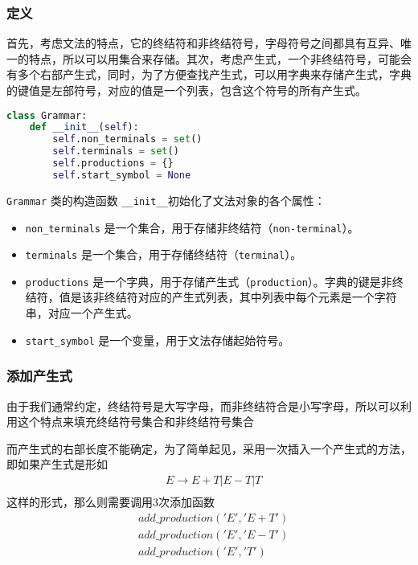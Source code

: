 \documentclass[lang=cn,11pt,a4paper]{elegantpaper}
\begin{document}
\subsubsection{定义}
首先，考虑文法的特点，它的终结符和非终结符号，字母符号之间都具有互异、唯一的特点，所以可以用集合来存储。其次，考虑产生式，一个非终结符号，可能会有多个右部产生式，同时，为了方便查找产生式，可以用字典来存储产生式，字典的键值是左部符号，对应的值是一个列表，包含这个符号的所有产生式。

\begin{lstlisting}[language=Python]
class Grammar:
    def __init__(self):
        self.non_terminals = set()
        self.terminals = set()
        self.productions = {}
        self.start_symbol = None
\end{lstlisting}

\lstinline{Grammar} 类的构造函数 \lstinline{__init__}初始化了文法对象的各个属性：
\begin{itemize}
    \item \lstinline{non_terminals} 是一个集合，用于存储非终结符（\lstinline{non-terminal}）。
    \item \lstinline{terminals} 是一个集合，用于存储终结符（\lstinline{terminal}）。
    \item \lstinline{productions} 是一个字典，用于存储产生式（\lstinline{production}）。字典的键是非终结符，值是该非终结符对应的产生式列表，其中列表中每个元素是一个字符串，对应一个产生式。
    \item \lstinline{start_symbol} 是一个变量，用于文法存储起始符号。
\end{itemize}

\subsubsection{添加产生式}

由于我们通常约定，终结符号是大写字母，而非终结符合是小写字母，所以可以利用这个特点来填充终结符号集合和非终结符号集合

而产生式的右部长度不能确定，为了简单起见，采用一次插入一个产生式的方法，即如果产生式是形如
$$
\begin{aligned}
& E\rightarrow E+T | E-T | T \\
\end{aligned}
$$
这样的形式，那么则需要调用3次添加函数
$$
\begin{aligned}
& add\_production('E', 'E+T') \\
& add\_production('E', 'E-T') \\
& add\_production('E', 'T')
\end{aligned}
$$
\end{document}
